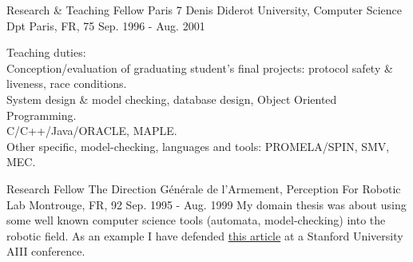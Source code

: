 \begin{cventries}
  \cventry
    {Research \& Teaching Fellow} %
    {Paris 7 Denis Diderot University, Computer Science Dpt} %
    {Paris, FR, 75} %
    {Sep. 1996 - Aug. 2001} %
    {} %
{
      \begin{cvitems} %
        \item {Teaching duties:\\Conception/evaluation of graduating student's final projects: protocol safety \& liveness, race conditions.\\System design \& model checking, database design, Object Oriented Programming.\\C/C++/Java/ORACLE, MAPLE.\\Other specific, model-checking, languages and tools: PROMELA/SPIN, SMV, MEC.}
      \end{cvitems}
} %

  \cventry
    {Research Fellow} %
    {The Direction Générale de l'Armement, Perception For Robotic Lab} %
    {Montrouge, FR, 92} %
    {Sep. 1995 - Aug. 1999} %
{
My domain thesis was about using some well known computer science tools (automata, model-checking) into the robotic field. As an example I have defended \href{http://www.aaai.org/Papers/Symposia/Spring/1999/SS-99-05/SS99-05-001.pdf}{this article} at a Stanford University AIII conference.
} %
    {} %

\end{cventries}
